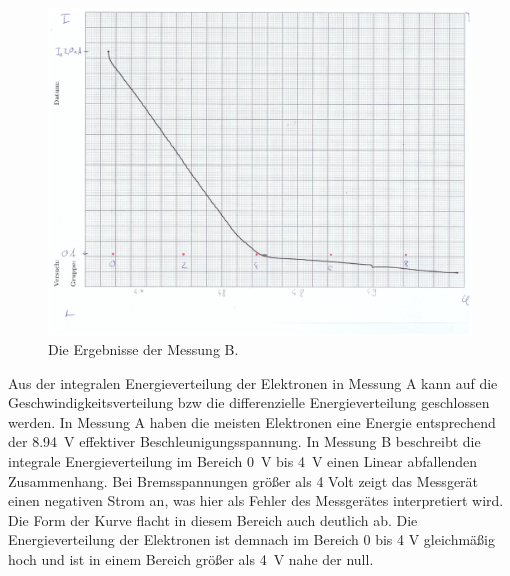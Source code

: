 \begin{figure}[h]
    \centering
    \includegraphics[height=0.4\textheight]{Abbildungen/Messung_B.pdf}
    \caption{Die Ergebnisse der Messung B.}
    \label{fig:messung_b}
\end{figure}

\noindent
Aus der integralen Energieverteilung der Elektronen in Messung A kann auf die Geschwindigkeitsverteilung
bzw die differenzielle Energieverteilung geschlossen werden.
In Messung A haben die meisten Elektronen eine Energie entsprechend der \qty{8.94}{\volt} effektiver Beschleunigungsspannung.
In Messung B beschreibt die integrale Energieverteilung im Bereich \qty{0}{\volt} bis \qty{4}{\volt} einen Linear abfallenden Zusammenhang.
Bei Bremsspannungen größer als 4 Volt zeigt das Messgerät einen negativen Strom an, was hier als Fehler des Messgerätes interpretiert wird.
Die Form der Kurve flacht in diesem Bereich auch deutlich ab.
Die Energieverteilung der Elektronen ist demnach im Bereich 0 bis 4 \unit{\volt} gleichmäßig hoch und ist in einem Bereich größer als
\qty{4}{\volt} nahe der null.

